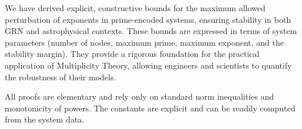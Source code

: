 \documentclass[12pt,a4paper]{article}
\begin{document}
We have derived explicit, constructive bounds for the maximum allowed perturbation of exponents in prime‐encoded systems, ensuring stability in both GRN and astrophysical contexts. These bounds are expressed in terms of system parameters (number of nodes, maximum prime, maximum exponent, and the stability margin). They provide a rigorous foundation for the practical application of Multiplicity Theory, allowing engineers and scientists to quantify the robustness of their models.

All proofs are elementary and rely only on standard norm inequalities and monotonicity of powers. The constants are explicit and can be readily computed from the system data.




\nocite{*}
  

\end{document}
